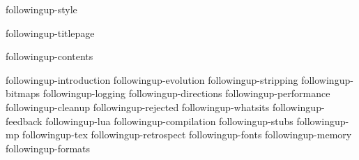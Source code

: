 \environment followingup-style

\dontcomplain

\startdocument

    \component followingup-titlepage

    \startfrontmatter
        \component followingup-contents
    \stopfrontmatter

    \startbodymatter
        \component followingup-introduction
        \component followingup-evolution
        \component followingup-stripping
        \component followingup-bitmaps
        \component followingup-logging
        \component followingup-directions
        \component followingup-performance
        \component followingup-cleanup
        \component followingup-rejected
        \component followingup-whatsits
        \component followingup-feedback
        \component followingup-lua
        \component followingup-compilation
        \component followingup-stubs
        \component followingup-mp
        \component followingup-tex
        \component followingup-retrospect
        \component followingup-fonts
        \component followingup-memory
        \component followingup-formats
    \stopbodymatter

\stopdocument

